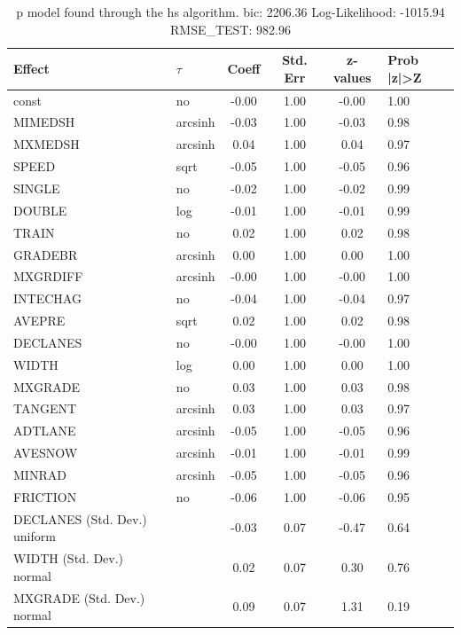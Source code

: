 \begin{table}
	\caption{p model found through the hs algorithm. bic: 2206.36 Log-Likelihood: -1015.94 RMSE_TEST: 982.96}
	\begin{center}
		\begin{tabular}{|l|l|c|c|c|l|}
			\hline
			Effect & $\tau$ & Coeff & Std. Err & z-values & Prob |z|>Z \\
			\hline
			const & no & -0.00 & 1.00 & -0.00 & 1.00 \\
			\hline
			MIMEDSH & arcsinh & -0.03 & 1.00 & -0.03 & 0.98 \\
			\hline
			MXMEDSH & arcsinh & 0.04 & 1.00 & 0.04 & 0.97 \\
			\hline
			SPEED & sqrt & -0.05 & 1.00 & -0.05 & 0.96 \\
			\hline
			SINGLE & no & -0.02 & 1.00 & -0.02 & 0.99 \\
			\hline
			DOUBLE & log & -0.01 & 1.00 & -0.01 & 0.99 \\
			\hline
			TRAIN & no & 0.02 & 1.00 & 0.02 & 0.98 \\
			\hline
			GRADEBR & arcsinh & 0.00 & 1.00 & 0.00 & 1.00 \\
			\hline
			MXGRDIFF & arcsinh & -0.00 & 1.00 & -0.00 & 1.00 \\
			\hline
			INTECHAG & no & -0.04 & 1.00 & -0.04 & 0.97 \\
			\hline
			AVEPRE & sqrt & 0.02 & 1.00 & 0.02 & 0.98 \\
			\hline
			DECLANES & no & -0.00 & 1.00 & -0.00 & 1.00 \\
			\hline
			WIDTH & log & 0.00 & 1.00 & 0.00 & 1.00 \\
			\hline
			MXGRADE & no & 0.03 & 1.00 & 0.03 & 0.98 \\
			\hline
			TANGENT & arcsinh & 0.03 & 1.00 & 0.03 & 0.97 \\
			\hline
			ADTLANE & arcsinh & -0.05 & 1.00 & -0.05 & 0.96 \\
			\hline
			AVESNOW & arcsinh & -0.01 & 1.00 & -0.01 & 0.99 \\
			\hline
			MINRAD & arcsinh & -0.05 & 1.00 & -0.05 & 0.96 \\
			\hline
			FRICTION & no & -0.06 & 1.00 & -0.06 & 0.95 \\
			\hline
			DECLANES (Std. Dev.) uniform &  & -0.03 & 0.07 & -0.47 & 0.64 \\
			\hline
			WIDTH (Std. Dev.) normal &  & 0.02 & 0.07 & 0.30 & 0.76 \\
			\hline
			MXGRADE (Std. Dev.) normal &  & 0.09 & 0.07 & 1.31 & 0.19 \\

\end{tabular}
\end{center}
\end{table}
